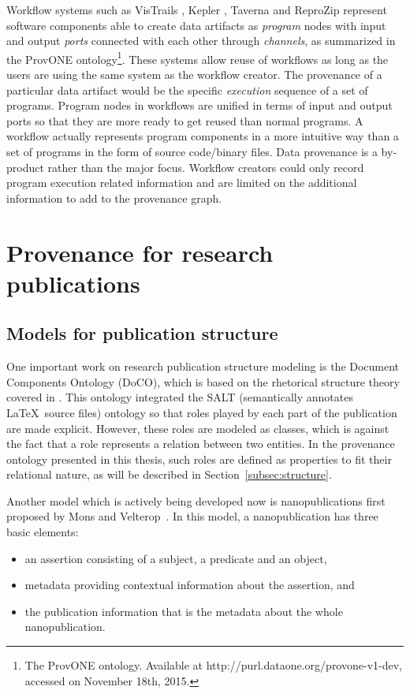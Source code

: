Workflow systems such as VisTrails \cite{freire2014reproducibility}, Kepler \cite{ludascher2006scientific}, Taverna \cite{wolstencroft2013taverna} and ReproZip \cite{chirigati2013reprozip} represent software components able to create data artifacts as \emph{program} nodes with input and output \emph{ports} connected with each other through \emph{channels}, as summarized in the ProvONE ontology\footnote{The ProvONE ontology. Available at http://purl.dataone.org/provone-v1-dev, accessed on November 18th, 2015.}. These systems allow reuse of workflows as long as the users are using the same system as the workflow creator. The provenance of a particular data artifact would be the specific \emph{execution} sequence of a set of programs. Program nodes in workflows are unified in terms of input and output ports so that they are more ready to get reused than normal programs. A workflow actually represents program components in a more intuitive way than a set of programs in the form of source code/binary files. Data provenance is a by-product rather than the major focus. Workflow creators could only record program execution related information and are limited on the additional information to add to the provenance graph.

\section{Provenance for research publications}
\subsection{Models for publication structure}
One important work on research publication structure modeling is the Document Components Ontology (DoCO), which is based on the rhetorical structure theory covered in \cite{taboada2006rhetorical}. This ontology integrated the SALT \cite{groza2007salt} (semantically annotates \LaTeX \ source files) ontology so that roles played by each part of the publication are made explicit. However, these roles are modeled as classes, which is against the fact that a role represents a relation between two entities. In the provenance ontology presented in this thesis, such roles are defined as properties to fit their relational nature, as will be described in Section~\ref{subsec:structure}.

Another model which is actively being developed now is nanopublications first proposed by Mons and Velterop~\cite{mons2009nano}. In this model, a nanopublication has three basic elements:
\begin{itemize}
	\item an assertion consisting of a subject, a predicate and an object,
	\item metadata providing contextual information about the assertion, and
	\item the publication information that is the metadata about the whole nanopublication.
\end{itemize}

